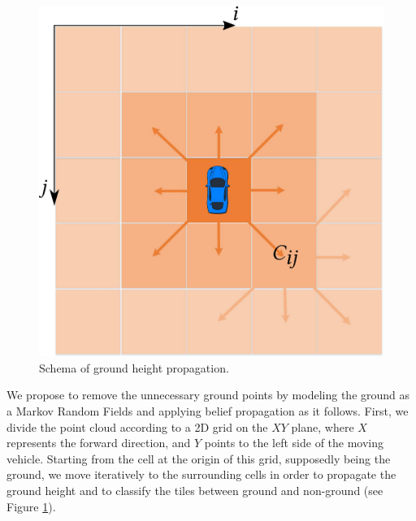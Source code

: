 \begin{figure}[t]
\centering
\includegraphics[width=0.99\columnwidth]{./img/ch-laser/groundpropagation_smal}
\caption{Schema of ground height propagation.}
\label{fig:propag}
\end{figure}

We propose to remove the unnecessary ground points by modeling the ground as a Markov Random Fields and applying belief propagation as it follows. 
First, we divide the point cloud according to a 2D grid on the $XY$ plane, where $X$ represents the forward direction, and $Y$ points to the left side of the moving vehicle. 
Starting from the cell at the origin of this grid, supposedly being the ground, we move iteratively to the surrounding cells in order to propagate the ground height and to classify the tiles between ground and non-ground (see Figure \ref{fig:propag}).

